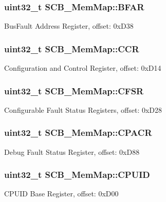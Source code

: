 \subsubsection[{B\+F\+A\+R}]{\setlength{\rightskip}{0pt plus 5cm}uint32\+\_\+t S\+C\+B\+\_\+\+Mem\+Map\+::\+B\+F\+A\+R}\label{struct_s_c_b___mem_map_a57e3932788931280ee70b7389c4b23f4}
Bus\+Fault Address Register, offset\+: 0x\+D38 \hypertarget{struct_s_c_b___mem_map_aa6e957027d8c505047cd58101bb784aa}{}
\subsubsection[{C\+C\+R}]{\setlength{\rightskip}{0pt plus 5cm}uint32\+\_\+t S\+C\+B\+\_\+\+Mem\+Map\+::\+C\+C\+R}\label{struct_s_c_b___mem_map_aa6e957027d8c505047cd58101bb784aa}
Configuration and Control Register, offset\+: 0x\+D14 \hypertarget{struct_s_c_b___mem_map_a51c6a21cb789c655257efe5796c7f503}{}
\subsubsection[{C\+F\+S\+R}]{\setlength{\rightskip}{0pt plus 5cm}uint32\+\_\+t S\+C\+B\+\_\+\+Mem\+Map\+::\+C\+F\+S\+R}\label{struct_s_c_b___mem_map_a51c6a21cb789c655257efe5796c7f503}
Configurable Fault Status Registers, offset\+: 0x\+D28 \hypertarget{struct_s_c_b___mem_map_aa863fcf3f6eca09d9caec27247b017ae}{}
\subsubsection[{C\+P\+A\+C\+R}]{\setlength{\rightskip}{0pt plus 5cm}uint32\+\_\+t S\+C\+B\+\_\+\+Mem\+Map\+::\+C\+P\+A\+C\+R}\label{struct_s_c_b___mem_map_aa863fcf3f6eca09d9caec27247b017ae}
Debug Fault Status Register, offset\+: 0x\+D88 \hypertarget{struct_s_c_b___mem_map_ad020795dcc3605b4c828af83df8b8836}{}
\subsubsection[{C\+P\+U\+I\+D}]{\setlength{\rightskip}{0pt plus 5cm}uint32\+\_\+t S\+C\+B\+\_\+\+Mem\+Map\+::\+C\+P\+U\+I\+D}\label{struct_s_c_b___mem_map_ad020795dcc3605b4c828af83df8b8836}
C\+P\+U\+I\+D Base Register, offset\+: 0x\+D00 \hypertarget{struct_s_c_b___mem_map_af178d6003a18eb7452c51edcec14ec5d}{}
